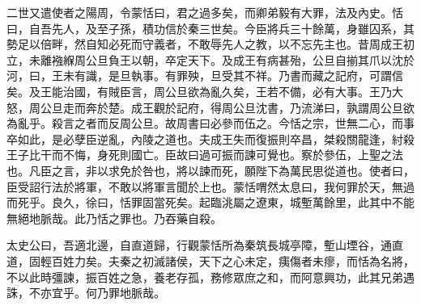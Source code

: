 二世又遣使者之陽周，令蒙恬曰，君之過多矣，而卿弟毅有大罪，法及內史。恬曰，自吾先人，及至子孫，積功信於秦三世矣。今臣將兵三十餘萬，身雖囚系，其勢足以倍畔，然自知必死而守義者，不敢辱先人之教，以不忘先主也。昔周成王初立，未離襁緥周公旦負王以朝，卒定天下。及成王有病甚殆，公旦自揃其爪以沈於河，曰，王未有識，是旦執事。有罪殃，旦受其不祥。乃書而藏之記府，可謂信矣。及王能治國，有賊臣言，周公旦欲為亂久矣，王若不備，必有大事。王乃大怒，周公旦走而奔於楚。成王觀於記府，得周公旦沈書，乃流涕曰，孰謂周公旦欲為亂乎。殺言之者而反周公旦。故周書曰必參而伍之。今恬之宗，世無二心，而事卒如此，是必孽臣逆亂，內陵之道也。夫成王失而復振則卒昌，桀殺關龍逢，紂殺王子比干而不悔，身死則國亡。臣故曰過可振而諫可覺也。察於參伍，上聖之法也。凡臣之言，非以求免於咎也，將以諫而死，願陛下為萬民思從道也。使者曰，臣受詔行法於將軍，不敢以將軍言聞於上也。蒙恬喟然太息曰，我何罪於天，無過而死乎。良久，徐曰，恬罪固當死矣。起臨洮屬之遼東，城塹萬餘里，此其中不能無絕地脈哉。此乃恬之罪也。乃吞藥自殺。

太史公曰，吾適北邊，自直道歸，行觀蒙恬所為秦筑長城亭障，塹山堙谷，通直道，固輕百姓力矣。夫秦之初滅諸侯，天下之心未定，痍傷者未瘳，而恬為名將，不以此時彊諫，振百姓之急，養老存孤，務修眾庶之和，而阿意興功，此其兄弟遇誅，不亦宜乎。何乃罪地脈哉。